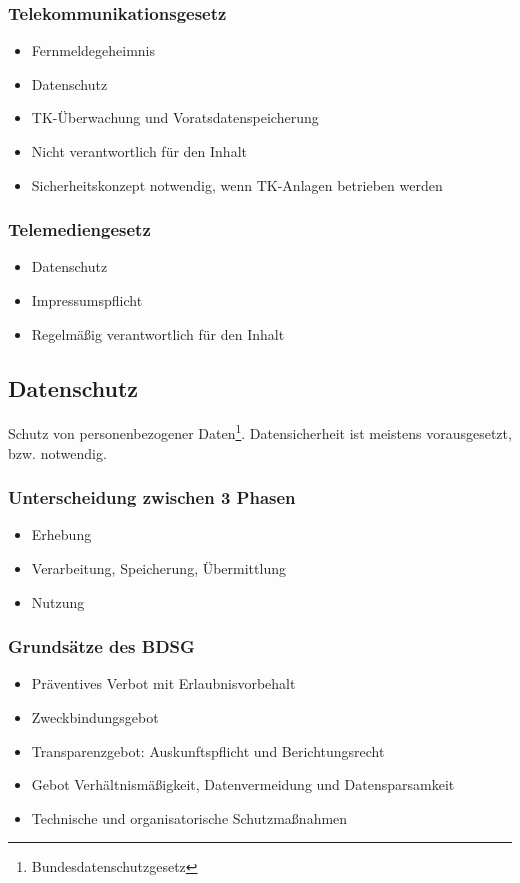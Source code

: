 \subsubsection{Telekommunikationsgesetz}
\begin{itemize}
	\item Fernmeldegeheimnis
	\item Datenschutz
	\item TK-Überwachung und Voratsdatenspeicherung
	\item Nicht verantwortlich für den Inhalt
	\item Sicherheitskonzept notwendig, wenn TK-Anlagen betrieben werden
\end{itemize}

\subsubsection{Telemediengesetz}
\begin{itemize}
	\item Datenschutz
	\item Impressumspflicht
	\item Regelmäßig verantwortlich für den Inhalt
\end{itemize}


\subsection{Datenschutz}
Schutz von personenbezogener Daten\footnote{Bundesdatenschutzgesetz}. Datensicherheit ist meistens vorausgesetzt, bzw. notwendig.

\subsubsection{Unterscheidung zwischen 3 Phasen}
\begin{itemize}
	\item Erhebung
	\item Verarbeitung, Speicherung, Übermittlung
	\item Nutzung
\end{itemize}

\subsubsection{Grundsätze des BDSG}
\begin{itemize}
	\item Präventives Verbot mit Erlaubnisvorbehalt
	\item Zweckbindungsgebot
	\item Transparenzgebot: Auskunftspflicht und Berichtungsrecht
	\item Gebot Verhältnismäßigkeit, Datenvermeidung und Datensparsamkeit
	\item Technische und organisatorische Schutzmaßnahmen
\end{itemize}


